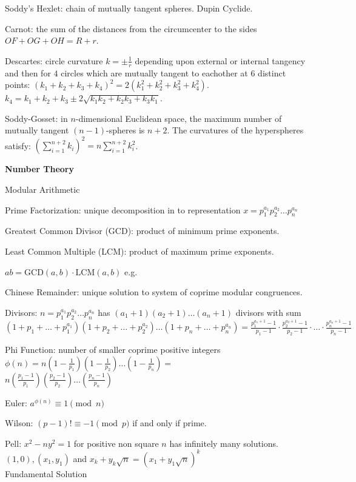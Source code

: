 Soddy's Hexlet: chain of mutually tangent spheres. Dupin Cyclide.

Carnot: the sum of the distances from the circumcenter to the sides $OF + OG + OH = R + r$.

Descartes: circle curvature $k = \pm \frac{1}{r}$ depending upon external or internal tangency and then for $4$ circles which are mutually tangent to eachother at $6$ distinct points: $\left( k_1 + k_2 + k_3 + k_4 \right)^2 = 2 \left( k_1^2 + k_2^2 + k_3^2 + k_4^2 \right)$. $k_4 = k_1 + k_2 + k_3 \pm 2 \sqrt{k_1 k_2 + k_2 k_3 + k_3 k_1}$.

Soddy-Gosset: in $n$-dimensional Euclidean space, the maximum number of mutually tangent $(n-1)$-spheres is $n+2$. The curvatures of the hyperspheres satisfy: $\left( \sum_{i=1}^{n+2} k_i \right)^2 = n \sum_{i=1}^{n+2} k_i^2$.

\newpage

\textbf{Number Theory}

Modular Arithmetic

Prime Factorization: unique decomposition in to representation $x=p_1^{a_1} p_2^{a_2}\dots p_n^{a_n}$

Greatest Common Divisor (GCD): product of minimum prime exponents.

Least Common Multiple (LCM): product of maximum prime exponents.

$ab=\text{GCD}(a,b) \cdot \text{LCM}(a,b)$ e.g.

Chinese Remainder: unique solution to system of coprime modular congruences.

Divisors: $n=p_1^{a_1} p_2^{a_2} \dots p_n^{a_n}$ has $(a_1 + 1)(a_2 + 1) \dots (a_n + 1)$ divisors with sum $(1+p_1+ \dots + p_1^{a_1})(1+p_2+ \dots + p_2^{a_2}) \dots (1+p_n+ \dots + p_n^{a_n}) = \frac{p_1^{a_1+1}-1}{p_1-1} \cdot \frac{p_2^{a_2+1}-1}{p_2-1} \cdot \dots \cdot \frac{p_n^{a_n+1}-1}{p_n-1}$

Phi Function: number of smaller coprime positive integers $\phi(n)=n\left(1-\frac{1}{p_1}\right)\left(1-\frac{1}{p_2}\right)\dots\left(1-\frac{1}{p_n}\right)=$ \\
$n\left(\frac{p_1-1}{p_1}\right)\left(\frac{p_2-1}{p_2}\right)\dots\left(\frac{p_n-1}{p_n}\right)$

Euler: $a^{\phi (n)} \equiv 1 \pmod{n}$

Wilson: $(p-1)! \equiv -1 \pmod{p}$ if and only if prime.

Pell: $x^2-ny^2=1$ for positive non square $n$ has infinitely many solutions. \\
$(1,0), (x_1,y_1)$ and $x_k+y_k \sqrt{n}=(x_1+y_1 \sqrt{n})^k$ \\
Fundamental Solution

